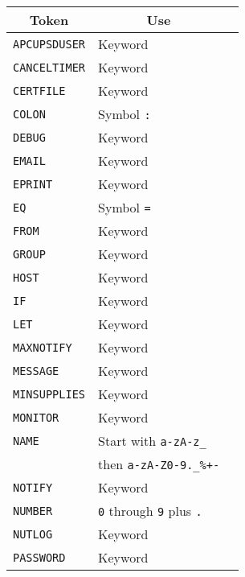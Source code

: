 \documentclass[12pt]{article}
\begin{document}
\clearpage
\twocolumn
\begin{figure}[ht]
\begin{center}
\begin{tabular}{|l|l|p{0.4\LinePrinterwidth}|}
\hline
\multicolumn{1}{|c|}{\textbf{Token}} & \multicolumn{1}{|c|}{\textbf{Use}} \\ \hline\hline
\texttt{APCUPSDUSER}     & Keyword                \\ \hline
\texttt{CANCELTIMER}     & Keyword                \\ \hline
\texttt{CERTFILE}        & Keyword                \\ \hline
\texttt{COLON}           & Symbol \texttt{:}      \\ \hline
\texttt{DEBUG}           & Keyword                \\ \hline
\texttt{EMAIL}           & Keyword                \\ \hline
\texttt{EPRINT}          & Keyword                \\ \hline
\texttt{EQ}              & Symbol \texttt{=}      \\ \hline
\texttt{FROM}            & Keyword                \\ \hline
\texttt{GROUP}           & Keyword                \\ \hline
\texttt{HOST}            & Keyword                \\ \hline
\texttt{IF}              & Keyword                \\ \hline
\texttt{LET}             & Keyword                \\ \hline
\texttt{MAXNOTIFY}       & Keyword                \\ \hline
\texttt{MESSAGE}         & Keyword                \\ \hline
\texttt{MINSUPPLIES}     & Keyword                \\ \hline
\texttt{MONITOR}         & Keyword                \\ \hline
\texttt{NAME}            & Start with \texttt{a-zA-z\_} \\
                         & then \texttt{a-zA-Z0-9.\_\%+-} \\ \hline
\texttt{NOTIFY}          & Keyword                \\ \hline
\texttt{NUMBER}          & \texttt{0} through \texttt{9} plus \texttt{.} \\ \hline
\texttt{NUTLOG}          & Keyword                \\ \hline
\texttt{PASSWORD}        & Keyword                \\ \hline

\end{tabular}
\end{center}
\end{figure}
\end{document}
